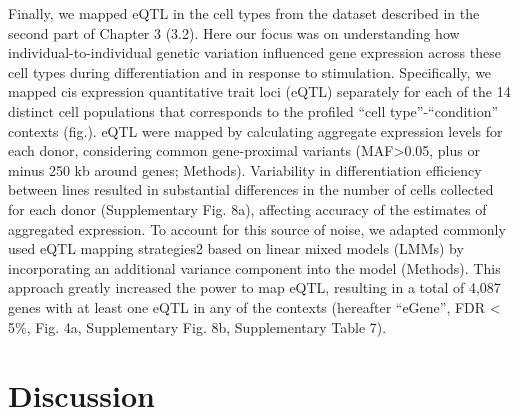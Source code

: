 Finally, we mapped eQTL in the cell types from the dataset described in the second part of Chapter 3 (3.2).
Here our focus was on understanding how individual-to-individual genetic variation influenced gene expression across these cell types during differentiation and in response to stimulation.
Specifically, we mapped cis expression quantitative trait loci (eQTL) separately for each of the 14 distinct cell populations that corresponds to the profiled “cell type”-“condition” contexts (fig.). 
eQTL were mapped by calculating aggregate expression levels for each donor, considering common gene-proximal variants (MAF>0.05, plus or minus 250 kb around genes; Methods). 
Variability in differentiation efficiency between lines resulted in substantial differences in the number of cells collected for each donor (Supplementary Fig. 8a), affecting accuracy of the estimates of aggregated expression. 
To account for this source of noise, we adapted commonly used eQTL mapping strategies2 based on linear mixed models (LMMs) by incorporating an additional variance component into the model (Methods). 
This approach greatly increased the power to map eQTL, resulting in a total of 4,087 genes with at least one eQTL in any of the contexts (hereafter “eGene”, FDR < 5\%, Fig. 4a, Supplementary Fig. 8b, Supplementary Table 7).

\section{Discussion}
